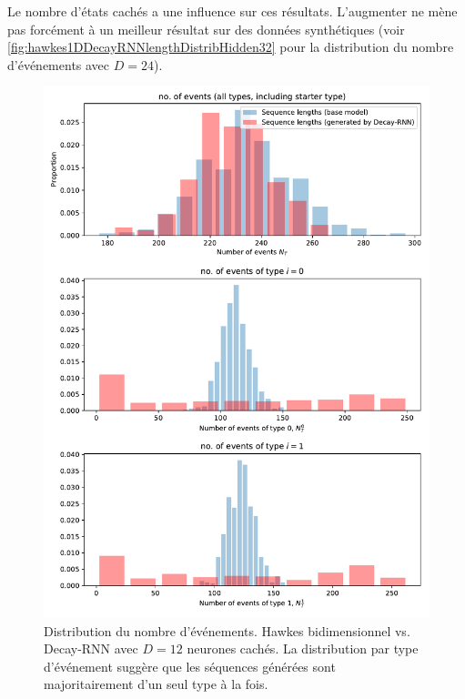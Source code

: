 \documentclass[../main.tex]{subfiles}
\begin{document}
Le nombre d'états cachés a une influence sur ces résultats. L'augmenter ne mène pas forcément à un meilleur résultat sur des données synthétiques (voir \cref{fig:hawkes1DDecayRNNlengthDistribHidden32} pour la distribution du nombre d'événements avec $D=24$).

\begin{figure}[htp]
	\includegraphics[width=\linewidth]{../results/seq_length_distrib_Decay-RNN-2d-hidden_12-20181201-003410.pdf}
	\caption{Distribution du nombre d'événements. Hawkes bidimensionnel vs. Decay-RNN avec $D=12$ neurones cachés. La distribution par type d'événement suggère que les séquences générées sont majoritairement d'un seul type à la fois.}\label{fig:hawkes2DDecayRNNlengthDistrib}
\end{figure}
\end{document}
